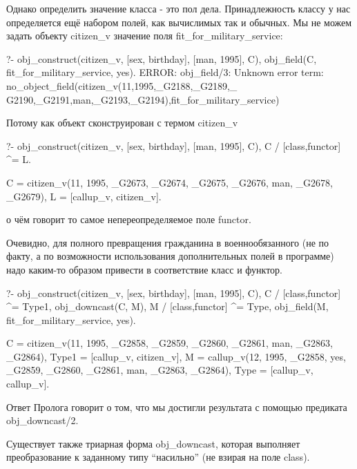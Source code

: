 \documentclass[a4paper]{book}
\begin{document}
Однако определить значение класса - это пол дела. Принадлежность
классу у нас определяется ещё набором полей, как вычислимых так и
обычных. Мы не можем задать объекту citizen_v значение поля
fit_for_military_service:

\begin{example}{}{}
?- obj_construct(citizen_v, [sex, birthday], [man, 1995], C),                            
   obj_field(C, fit_for_military_service, yes).
ERROR: obj_field/3: Unknown error term: no_object_field(citizen_v(11,1995,_G2188,_G2189,_
G2190,_G2191,man,_G2193,_G2194),fit_for_military_service)                               
\end{example}

Потому как объект сконструирован с термом citizen_v

\begin{example}{}{}
?- obj_construct(citizen_v, [sex, birthday], [man, 1995], C), 
   C / [class,functor] ^= L.

C = citizen_v(11, 1995, _G2673, _G2674, _G2675, _G2676, man, _G2678, _G2679),
L = [callup_v, citizen_v].
\end{example}

о чём говорит то самое непереопределяемое поле functor.

Очевидно, для полного превращения гражданина в военнообязанного
(не по факту, а по возможности использования дополнительных полей
в программе) надо каким-то образом привести в соответствие класс
и функтор.

\begin{example}{}{}
?- obj_construct(citizen_v, [sex, birthday], [man, 1995], C), 
   C / [class,functor] ^= Type1,
   obj_downcast(C, M),
   M / [class,functor] ^= Type,
   obj_field(M, fit_for_military_service, yes).

C = citizen_v(11, 1995, _G2858, _G2859, _G2860, _G2861, man, _G2863, _G2864),
Type1 = [callup_v, citizen_v],
M = callup_v(12, 1995, _G2858, yes, _G2859, _G2860, _G2861, man, _G2863, _G2864),
Type = [callup_v, callup_v].
\end{example}

Ответ Пролога говорит о том, что мы достигли
результата с помощью предиката obj_downcast/2.

Существует также триарная форма obj_downcast, которая выполняет
преобразование к заданному типу ``насильно'' (не взирая на поле class). 
\end{document}
